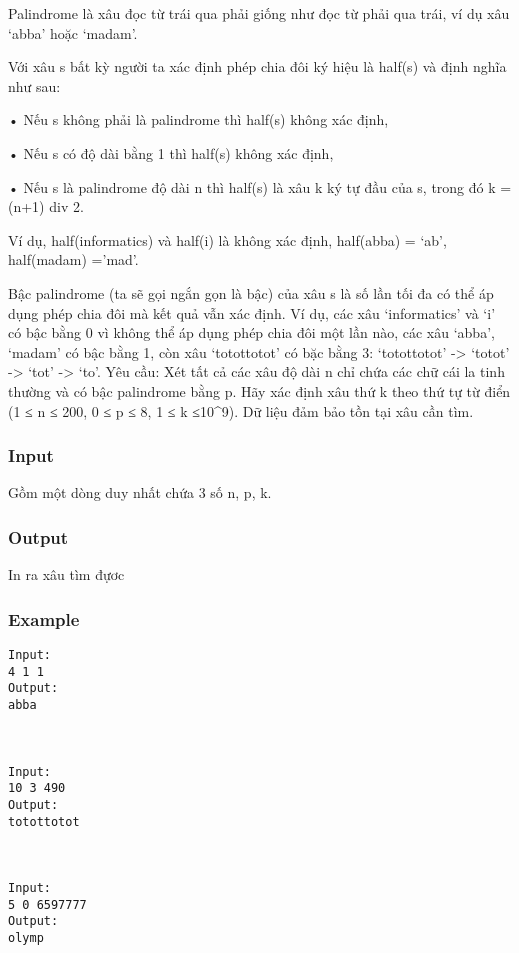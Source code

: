 



   Palindrome là xâu đọc từ trái qua phải giống như đọc từ phải qua trái, ví dụ xâu ‘abba’ hoặc ‘madam’.  

   Với xâu s bất kỳ người ta xác định phép chia đôi ký hiệu là half(s) và định nghĩa như sau:   


   • Nếu s không phải là palindrome thì half(s) không xác định,   


   • Nếu s có độ dài bằng 1 thì half(s) không xác định,   


   • Nếu s là palindrome độ dài n thì half(s) là xâu k ký tự đầu của s, trong đó k = (n+1) div 2.  

   Ví dụ, half(informatics) và half(i) là không xác định, half(abba) = ‘ab’, half(madam) =’mad’.  

   Bậc palindrome (ta sẽ gọi ngắn gọn là bậc) của xâu s là số lần tối đa có thể áp dụng phép chia đôi mà kết quả vẫn xác định. Ví dụ, các xâu ‘informatics’ và ‘i’ có bậc bằng 0 vì không thể áp dụng phép chia đôi một lần nào, các xâu ‘abba’, ‘madam’ có bậc bằng 1, còn xâu ‘totottotot’ có bặc bằng 3: ‘totottotot’ -> ‘totot’ -> ‘tot’ -> ‘to’.       Yêu cầu:      Xét tất cả các xâu độ dài n chỉ chứa các chữ cái la tinh thường và có bậc palindrome bằng p. Hãy xác định xâu thứ k theo thứ tự từ điển (1 ≤ n ≤ 200, 0 ≤ p ≤ 8, 1 ≤ k ≤10^9). Dữ liệu đảm bảo tồn tại xâu cần tìm.  

\subsubsection{   Input  }

   Gồm một dòng duy nhất chứa 3 số n, p, k.  

\subsubsection{   Output  }

   In ra xâu tìm đựơc  

\subsubsection{   Example  }
\begin{verbatim}
Input:
4 1 1
Output:
abba



Input:
10 3 490
Output:
totottotot



Input:
5 0 6597777
Output:
olymp
\end{verbatim}

